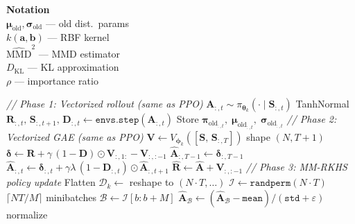 \documentclass[11pt]{article}
\begin{document}
\begin{algorithm}[p]
\begin{minipage}[t]{0.28\linewidth}
\vspace{6pt}
\textbf{Notation} \\[2pt]
$\boldsymbol{\mu}_{\text{old}}, \boldsymbol{\sigma}_{\text{old}}$ --- old dist.\ params \\
$k(\mathbf{a}, \mathbf{b})$ --- RBF kernel \\
$\widehat{\text{MMD}}^2$ --- MMD estimator \\
$D_{\text{KL}}$ --- KL approximation \\
$\rho$ --- importance ratio
\end{minipage}%
\hfill
\vrule
\hfill
\begin{minipage}[t]{0.68\linewidth}
\begin{algorithmic}[1]
    \Statex \hspace{\algorithmicindent}\textit{// Phase 1: Vectorized rollout (same as PPO)}
        \State $\mathbf{A}_{:,t} \sim \pi_{\boldsymbol{\theta}_k}(\cdot \mid \mathbf{S}_{:,t})$ \hfill TanhNormal
        \State $\mathbf{R}_{:,t},\, \mathbf{S}_{:,t+1},\, \mathbf{D}_{:,t} \gets \texttt{envs.step}(\mathbf{A}_{:,t})$
        \State Store $\boldsymbol{\pi}_{\text{old}_{:,t}},\; \boldsymbol{\mu}_{\text{old}_{:,t}},\; \boldsymbol{\sigma}_{\text{old}_{:,t}}$
    \EndFor
    \Statex \hspace{\algorithmicindent}\textit{// Phase 2: Vectorized GAE (same as PPO)}
    \State $\mathbf{V} \gets V_{\boldsymbol{\phi}_k}([\mathbf{S},\, \mathbf{S}_{:,T}])$ \hfill shape $(N, T{+}1)$
    \State $\boldsymbol{\delta} \gets \mathbf{R} + \gamma\,(1 - \mathbf{D}) \odot \mathbf{V}_{:,1:} - \mathbf{V}_{:,:-1}$
    \State $\hat{\mathbf{A}}_{:,T-1} \gets \boldsymbol{\delta}_{:,T-1}$
        \State $\hat{\mathbf{A}}_{:,t} \gets \boldsymbol{\delta}_{:,t} + \gamma \lambda\,(1 - \mathbf{D}_{:,t}) \odot \hat{\mathbf{A}}_{:,t+1}$
    \EndFor
    \State $\hat{\mathbf{R}} \gets \hat{\mathbf{A}} + \mathbf{V}_{:,:-1}$
    \Statex \hspace{\algorithmicindent}\textit{// Phase 3: MM-RKHS policy update}
    \State Flatten $\mathcal{D}_k \gets$ reshape to $(N \!\cdot\! T, \ldots)$
        \State $\mathcal{I} \gets \texttt{randperm}(N \!\cdot\! T)$
         \hfill $\lceil NT/M \rceil$ minibatches
            \State $\mathcal{B} \gets \mathcal{I}[b : b{+}M]$
            \State $\hat{\mathbf{A}}_\mathcal{B} \gets (\hat{\mathbf{A}}_\mathcal{B} - \texttt{mean}) / (\texttt{std} + \varepsilon)$ \hfill normalize

\end{algorithmic}
\end{minipage}
\end{algorithm}
\end{document}
